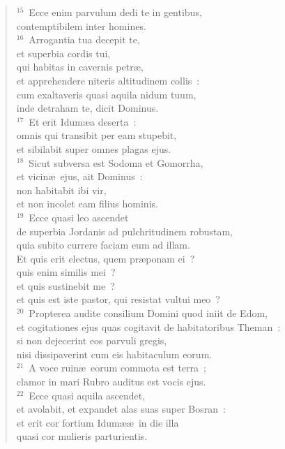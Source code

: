 \begin{flushleft}
\begin{verse}
${}^{15}$~Ecce enim parvulum dedi te in gentibus,\\ contemptibilem inter homines.\\
${}^{16}$~Arrogantia tua decepit te,\\ et superbia cordis tui,\\ qui habitas in cavernis petr\ae ,\\ et apprehendere niteris altitudinem collis~:\\ cum exaltaveris quasi aquila nidum tuum,\\ inde detraham te, dicit Dominus.\\
${}^{17}$~Et erit Idum\ae a deserta~:\\ omnis qui transibit per eam stupebit,\\ et sibilabit super omnes plagas ejus.\\
${}^{18}$~Sicut subversa est Sodoma et Gomorrha,\\ et vicin\ae\ ejus, ait Dominus~:\\ non habitabit ibi vir,\\ et non incolet eam filius hominis.\\
${}^{19}$~Ecce quasi leo ascendet\\ de superbia Jordanis ad pulchritudinem robustam,\\ quia subito currere faciam eum ad illam.\\ Et quis erit electus, quem pr\ae ponam ei~?\\ quis enim similis mei~?\\ et quis sustinebit me~?\\ et quis est iste pastor, qui resistat vultui meo~?\\
${}^{20}$~Propterea audite consilium Domini quod iniit de Edom,\\ et cogitationes ejus quas cogitavit de habitatoribus Theman~:\\ si non dejecerint eos parvuli gregis,\\ nisi dissipaverint cum eis habitaculum eorum.\\
${}^{21}$~A voce ruin\ae\ eorum commota est terra~;\\ clamor in mari Rubro auditus est vocis ejus.\\
${}^{22}$~Ecce quasi aquila ascendet,\\ et avolabit, et expandet alas suas super Bosran~:\\ et erit cor fortium Idum\ae \ae\ in die illa\\ quasi cor mulieris parturientis.\end{verse}\end{flushleft}


